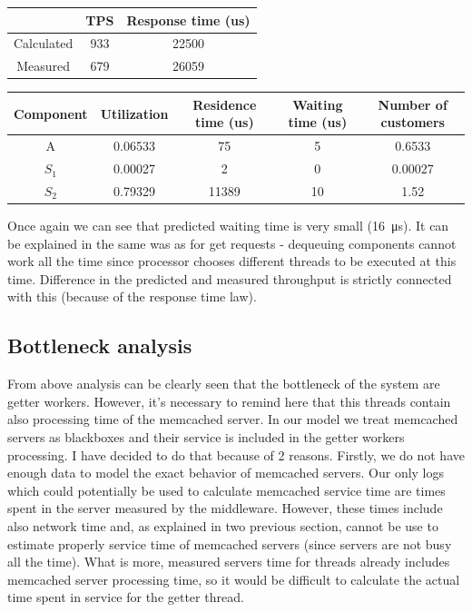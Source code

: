 \documentclass[11pt]{article}
\begin{document}
{\small
\begin{center}
\begin{tabular}{|c|c|c|}
\hline & TPS & Response time (us) \\
\hline Calculated & 933 & 22500 \\
\hline Measured & 679 & 26059 \\
\hline
\end{tabular}
\end{center}

\begin{center}
\begin{tabular}{|c|c|c|c|c|}
\hline Component & Utilization & Residence time (us) & Waiting time (us) & Number of customers\\
\hline A & 0.06533  & 75 & 5 & 0.6533 \\
\hline $S_1$ & 0.00027 & 2  & 0 & 0.00027 \\
\hline $S_2$ & 0.79329 & 11389 & 10 &1.52 \\
\hline
\end{tabular}
\end{center}
}

Once again we can see that predicted waiting time is very small (\SI{16}{\micro\second}). It can be explained in the same was as for get requests - dequeuing components cannot work all the time since processor chooses different threads to be executed at this time. Difference in the predicted and measured throughput is strictly connected with this (because of the  response time law).

\subsection{Bottleneck analysis}
\label{sec:bottleneck}

From above analysis can be clearly seen that the bottleneck of the system are getter workers. However, it's necessary to remind here that this threads contain also processing time of the memcached server. In our model we treat memcached servers as blackboxes and their service is included in the getter workers processing. I have decided to do that because of 2 reasons. Firstly, we do not have enough data to model the exact behavior of memcached servers. Our only logs which could potentially be used to calculate memcached service time are times spent in the server measured by the middleware. However, these times include also network time and, as explained in two previous section, cannot be use to estimate properly service time of memcached servers (since servers are not busy all the time). What is more, measured servers time for threads already includes memcached server processing time, so it would be difficult to calculate the actual time spent in service for the getter thread.
\end{document}
